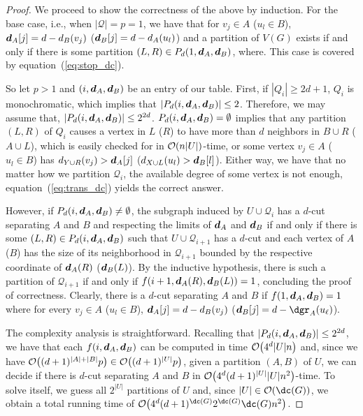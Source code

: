\begin{proof}
    We proceed to show the correctness of the above by induction.
    For the base case, i.e., when $|\mathcal{Q}| = p = 1$, we have that for $v_j \in A$ ($u_l \in B$),  $\boldsymbol{d}_A[j] = d - d_B(v_j)$ ($\boldsymbol{d}_B[j] = d - d_A(u_l)$) and a partition of $V(G)$ exists if and only if there is some partition $(L, R) \in P_d(1, \boldsymbol{d}_A, \boldsymbol{d}_B)$, where.
    This case is covered by equation~(\ref{eq:stop_dc}).

    So let $p > 1$ and $(i, \boldsymbol{d}_A, \boldsymbol{d}_B)$ be an entry of our table.
    First, if $|Q_i| \geq 2d+1$, $Q_i$ is monochromatic, which implies that $|P_d(i, \boldsymbol{d}_A, \boldsymbol{d}_B)| \leq 2$.
    Therefore, we may assume that, $|P_d(i, \boldsymbol{d}_A, \boldsymbol{d}_B)| \leq 2^{2d}$.
    $P_d(i, \boldsymbol{d}_A, \boldsymbol{d}_B) = \emptyset$ implies that any partition $(L, R)$ of $Q_i$ causes a vertex in $L$ ($R$) to have more than $d$ neighbors in $B \cup R$ ($A \cup L$), which is easily checked for in $\mathcal{O}\!\left(n|U|\right)$-time, or some vertex $v_j \in A$ ($u_l \in B$) has $d_{Y \cup R}(v_j) > \boldsymbol{d}_A[j]$ ($d_{X \cup L}(u_l) > \boldsymbol{d}_B[l]$).
    Either way, we have that no matter how we partition $\mathcal{Q}_i$, the available degree of some vertex is not enough, equation~(\ref{eq:trans_dc}) yields the correct answer.

    However, if $P_d(i, \boldsymbol{d}_A, \boldsymbol{d}_B) \neq \emptyset$, the subgraph induced by $U \cup \mathcal{Q}_i$ has a $d$-cut separating $A$ and $B$ and respecting the limits of $\boldsymbol{d}_A$ and $\boldsymbol{d}_B$ if and only if there is some $(L, R) \in P_d(i, \boldsymbol{d}_A, \boldsymbol{d}_B)$ such that $U \cup \mathcal{Q}_{i+1}$ has a $d$-cut and each vertex of $A$ ($B$) has the size of its neighborhood in $\mathcal{Q}_{i+1}$ bounded by the respective coordinate of $\boldsymbol{d}_A(R)$ ($\boldsymbol{d}_B(L)$).
    By the inductive hypothesis, there is such a partition of $\mathcal{Q}_{i+1}$ if and only if $f(i+1, \boldsymbol{d}_A(R), \boldsymbol{d}_B(L)) = 1$, concluding the proof of correctness.
    Clearly, there is a $d$-cut separating $A$ and $B$ if $f(1, \boldsymbol{d}_A, \boldsymbol{d}_B) = 1$ where for every $v_j \in A$ ($u_l \in B$),  $\boldsymbol{d}_A[j] = d - d_B(v_j)$ ($\bmd_B[j] = d - \dgr_A(u_{\ell})$).

    The complexity analysis is straightforward.
    Recalling that $|P_d(i, \boldsymbol{d}_A, \boldsymbol{d}_B)| \leq 2^{2d}$, we have that each $f(i, \boldsymbol{d}_A, \boldsymbol{d}_B)$ can be computed in time $\mathcal{O}\!\left(4^d|U|n\right)$ and, since we have $\mathcal{O}\!\left((d+1)^{|A| + |B|}p\right) \in \mathcal{O}\!\left((d+1)^{|U|}p\right)$, given a partition $(A, B)$ of $U$, we can decide if there is $d$-cut separating $A$ and $B$ in $\mathcal{O}\!\left(4^d(d+1)^{|U|}|U|n^2\right)$-time.
    To solve  itself, we guess all $2^{|U|}$ partitions of $U$ and, since $|U| \in \bigO{\dc(G)}$, we obtain a total running time of $\bigO{4^d(d+1)^{\dc(G)}2^{\dc(G)}\dc(G)n^2}$.
\end{proof}



